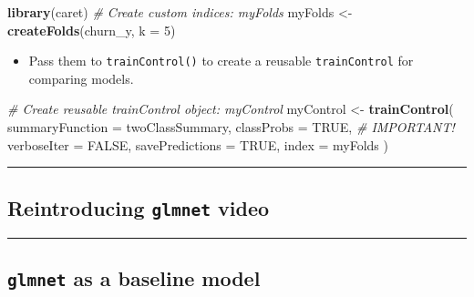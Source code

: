 \documentclass[
]{book}
\newenvironment{Shaded}{\begin{snugshade}}{\end{snugshade}}
\newcommand{\CommentTok}[1]{\textcolor[rgb]{0.56,0.35,0.01}{\textit{#1}}}
\newcommand{\DataTypeTok}[1]{\textcolor[rgb]{0.13,0.29,0.53}{#1}}
\newcommand{\DecValTok}[1]{\textcolor[rgb]{0.00,0.00,0.81}{#1}}
\newcommand{\KeywordTok}[1]{\textcolor[rgb]{0.13,0.29,0.53}{\textbf{#1}}}
\newcommand{\NormalTok}[1]{#1}
\newcommand{\OtherTok}[1]{\textcolor[rgb]{0.56,0.35,0.01}{#1}}
\newcommand{\StringTok}[1]{\textcolor[rgb]{0.31,0.60,0.02}{#1}}
\providecommand{\tightlist}{%
  \setlength{\itemsep}{0pt}\setlength{\parskip}{0pt}}
\begin{document}
\begin{Shaded}
\begin{Highlighting}[]
\KeywordTok{library}\NormalTok{(caret)}
\CommentTok{# Create custom indices: myFolds}
\NormalTok{myFolds <-}\StringTok{ }\KeywordTok{createFolds}\NormalTok{(churn_y, }\DataTypeTok{k =} \DecValTok{5}\NormalTok{)}
\end{Highlighting}
\end{Shaded}

\begin{itemize}
\tightlist
\item
  Pass them to \texttt{trainControl()} to create a reusable \texttt{trainControl} for comparing models.
\end{itemize}

\begin{Shaded}
\begin{Highlighting}[]
\CommentTok{# Create reusable trainControl object: myControl}
\NormalTok{myControl <-}\StringTok{ }\KeywordTok{trainControl}\NormalTok{(}
  \DataTypeTok{summaryFunction =}\NormalTok{ twoClassSummary,}
  \DataTypeTok{classProbs =} \OtherTok{TRUE}\NormalTok{, }\CommentTok{# IMPORTANT!}
  \DataTypeTok{verboseIter =} \OtherTok{FALSE}\NormalTok{,}
  \DataTypeTok{savePredictions =} \OtherTok{TRUE}\NormalTok{,}
  \DataTypeTok{index =}\NormalTok{ myFolds}
\NormalTok{)}
\end{Highlighting}
\end{Shaded}

\begin{center}\rule{0.5\linewidth}{0.5pt}\end{center}

\hypertarget{reintroducing-glmnet-video}{%
\subsection*{\texorpdfstring{Reintroducing \texttt{glmnet} video}{Reintroducing glmnet video}}\label{reintroducing-glmnet-video}}

\begin{center}\rule{0.5\linewidth}{0.5pt}\end{center}

\hypertarget{glmnet-as-a-baseline-model}{%
\subsection*{\texorpdfstring{\texttt{glmnet} as a baseline model}{glmnet as a baseline model}}\label{glmnet-as-a-baseline-model}}
\end{document}
